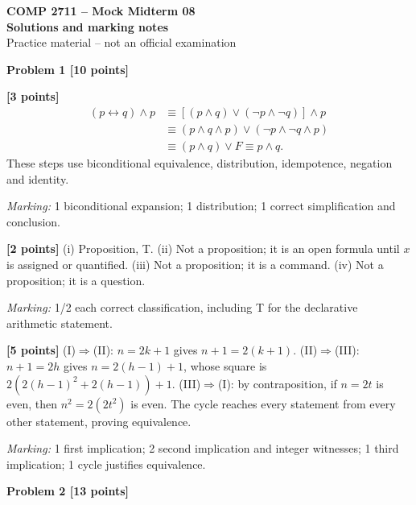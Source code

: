 \documentclass[12pt,letterpaper]{article}
\newcommand{\problemheading}[2][5\baselineskip]{\Needspace{#1}\par\noindent\hspace*{-0.625in}\textbf{#2}\par\nobreak\vspace{0.3em}}
\begin{document}
\begin{center}\textbf{COMP 2711 -- Mock Midterm 08}\\{\large\bfseries Solutions and marking notes}\\Practice material -- not an official examination\end{center}\vspace{0.5em}
\problemheading[\dimexpr 3\baselineskip+4\baselineskip\relax]{Problem 1 [10 points]}
\begin{description}[font=\normalfont,leftmargin=1.2em,labelsep=0.4em]
\item[(a)] \textbf{[3 points]} \[\begin{aligned}(p\leftrightarrow q)\land p&\equiv[(p\land q)\lor(\neg p\land\neg q)]\land p\\&\equiv(p\land q\land p)\lor(\neg p\land\neg q\land p)\\&\equiv(p\land q)\lor F\equiv p\land q.\end{aligned}\] These steps use biconditional equivalence, distribution, idempotence, negation and identity.
\par\textit{Marking:} 1 biconditional expansion; 1 distribution; 1 correct simplification and conclusion.
\item[(b)] \textbf{[2 points]} (i) Proposition, T. (ii) Not a proposition; it is an open formula until $x$ is assigned or quantified. (iii) Not a proposition; it is a command. (iv) Not a proposition; it is a question.
\par\textit{Marking:} 1/2 each correct classification, including T for the declarative arithmetic statement.
\item[(c)] \textbf{[5 points]} (I)$\Rightarrow$(II): $n=2k+1$ gives $n+1=2(k+1)$. (II)$\Rightarrow$(III): $n+1=2h$ gives $n=2(h-1)+1$, whose square is $2(2(h-1)^2+2(h-1))+1$. (III)$\Rightarrow$(I): by contraposition, if $n=2t$ is even, then $n^2=2(2t^2)$ is even. The cycle reaches every statement from every other statement, proving equivalence.
\par\textit{Marking:} 1 first implication; 2 second implication and integer witnesses; 1 third implication; 1 cycle justifies equivalence.
\end{description}
\vspace{0.65em}
\problemheading[\dimexpr 3\baselineskip+4\baselineskip\relax]{Problem 2 [13 points]}
\end{document}
